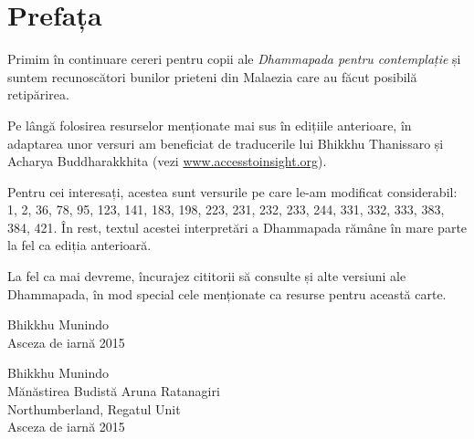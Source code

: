 
\chapter[Prefața ediției a patra (2015)]{Prefața}

Primim în continuare cereri pentru copii ale \emph{Dhammapada pentru contemplație} și suntem recunoscători bunilor prieteni din Malaezia care au făcut posibilă retipărirea.

Pe lângă folosirea resurselor menționate mai sus în edițiile anterioare, în adaptarea unor versuri am beneficiat de traducerile lui Bhikkhu Thanissaro și Acharya Buddharakkhita (vezi
\href{http://accesstoinsight.org}{www.accesstoinsight.org}).

Pentru cei interesați, acestea sunt versurile pe care le-am modificat considerabil: 1, 2, 36, 78, 95, 123, 141, 183, 198, 223, 231, 232, 233, 244, 331, 332, 333, 383, 384, 421. În rest, textul acestei interpretări a Dhammapada rămâne în mare parte la fel ca ediția anterioară.

La fel ca mai devreme, încurajez cititorii să consulte și alte versiuni ale Dhammapada, în mod special cele menționate ca resurse pentru această carte.

\ifpocketversion

\enlargethispage{\baselineskip}

{\raggedleft
Bhikkhu Munindo\\
Asceza de iarnă 2015
\par}

\else

{\raggedleft
Bhikkhu Munindo\\
Mănăstirea Budistă Aruna Ratanagiri\\
Northumberland, Regatul Unit\\
Asceza de iarnă 2015
\par}

\fi
